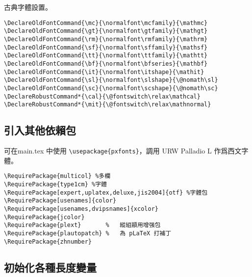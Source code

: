 \par 古典字體設置。
\begin{lstlisting}[firstnumber=210]
\DeclareOldFontCommand{\mc}{\normalfont\mcfamily}{\mathmc}
\DeclareOldFontCommand{\gt}{\normalfont\gtfamily}{\mathgt}
\DeclareOldFontCommand{\rm}{\normalfont\rmfamily}{\mathrm}
\DeclareOldFontCommand{\sf}{\normalfont\sffamily}{\mathsf}
\DeclareOldFontCommand{\tt}{\normalfont\ttfamily}{\mathtt}
\DeclareOldFontCommand{\bf}{\normalfont\bfseries}{\mathbf}
\DeclareOldFontCommand{\it}{\normalfont\itshape}{\mathit}
\DeclareOldFontCommand{\sl}{\normalfont\slshape}{\@nomath\sl}
\DeclareOldFontCommand{\sc}{\normalfont\scshape}{\@nomath\sc}
\DeclareRobustCommand*{\cal}{\@fontswitch\relax\mathcal}
\DeclareRobustCommand*{\mit}{\@fontswitch\relax\mathnormal}
\end{lstlisting}

\subsection{引入其他依賴包}
\par 可在main.tex 中使用 \verb+\usepackage{pxfonts}+，調用 URW Palladio L 作爲西文字體。
\begin{lstlisting}[firstnumber=223]
\RequirePackage{multicol} %多欄
\RequirePackage{type1cm} %字體
\RequirePackage[expert,uplatex,deluxe,jis2004]{otf} %字體包
\RequirePackage[usenames]{color}
\RequirePackage[usenames,dvipsnames]{xcolor}
\RequirePackage{jcolor}
\RequirePackage{plext}       %   縱組顓用增强包
\RequirePackage{plautopatch} %   為 pLaTeX 打補丁
\RequirePackage{zhnumber}
\end{lstlisting}

\subsection{初始化各種長度變量}

